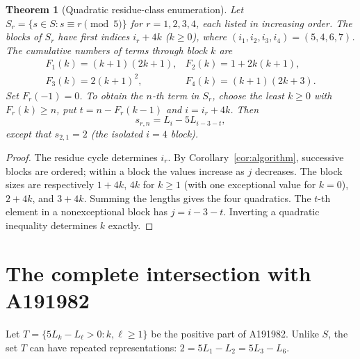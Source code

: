 \documentclass[11pt]{article}
\newtheorem{theorem}{Theorem}
\begin{document}
\begin{theorem}[Quadratic residue-class enumeration]\label{thm:residue}
Let $S_r=\{s\in S:s\equiv r\pmod5\}$ for $r=1,2,3,4$,
each listed in increasing order. The blocks of $S_r$ have
first indices $i_r+4k$ ($k\ge0$), where
$(i_1,i_2,i_3,i_4)=(5,4,6,7)$. The cumulative numbers
of terms through block $k$ are
\[
\begin{array}{ll}
F_1(k)=(k+1)(2k+1),&F_2(k)=1+2k(k+1),\\
F_3(k)=2(k+1)^2,&F_4(k)=(k+1)(2k+3).
\end{array}
\]
Set $F_r(-1)=0$. To obtain the $n$-th term in $S_r$, choose
the least $k\ge0$ with $F_r(k)\ge n$, put
$t=n-F_r(k-1)$ and $i=i_r+4k$. Then
\[
s_{r,n}=L_i-5L_{i-3-t},
\]
except that $s_{2,1}=2$ (the isolated $i=4$ block).
\end{theorem}
\begin{proof}
The residue cycle determines $i_r$.
By Corollary~\ref{cor:algorithm}, successive blocks are ordered;
within a block the values increase as $j$ decreases.
The block sizes are respectively $1+4k$,
$4k$ for $k\ge1$ (with one exceptional value for $k=0$),
$2+4k$, and $3+4k$. Summing the lengths gives the four
quadratics. The $t$-th element in a nonexceptional block has
$j=i-3-t$. Inverting a quadratic inequality determines $k$ exactly.
\end{proof}

\section*{The complete intersection with A191982}
Let $T=\{5L_k-L_\ell>0:k,\ell\ge1\}$ be the positive part of
A191982. Unlike $S$, the set $T$ can have repeated representations:
$2=5L_1-L_2=5L_3-L_6$.
\end{document}
